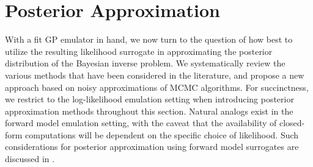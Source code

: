 \documentclass[12pt]{article}
\begin{document}
\section{Posterior Approximation} \label{sec:post_approx}
With a fit GP emulator in hand, we now turn to the question of how best to utilize the resulting likelihood surrogate 
in approximating the posterior 
distribution of the Bayesian inverse problem. We systematically review the various methods that have been considered in the 
literature, and propose a new approach based on noisy approximations of MCMC algorithms. For succinctness, we restrict 
to the log-likelihood emulation setting when introducing posterior approximation methods throughout this section. Natural 
analogs exist in the forward model emulation setting, with the caveat that the availability of closed-form computations will 
be dependent on the specific choice of likelihood. Such considerations for posterior approximation using forward model 
surrogates are discussed in . 

\end{document}
